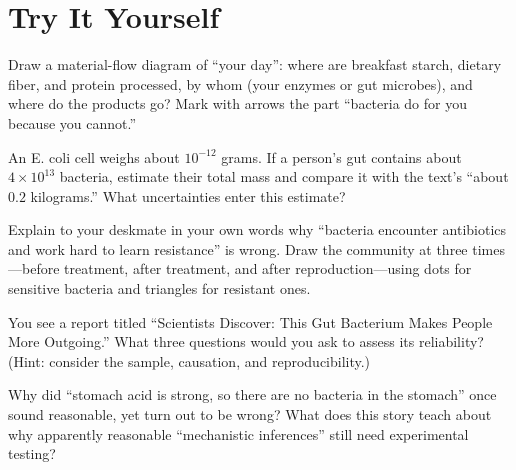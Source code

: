 \section*{Try It Yourself}

\begin{sikaoti}
\item Draw a material-flow diagram of ``your day'': where are breakfast starch, dietary fiber, and protein processed, by whom (your enzymes or gut microbes), and where do the products go? Mark with arrows the part ``bacteria do for you because you cannot.''
\item An E. coli cell weighs about $10^{-12}$ grams. If a person's gut contains about $4\times 10^{13}$ bacteria, estimate their total mass and compare it with the text's ``about $0.2$ kilograms.'' What uncertainties enter this estimate?
\item Explain to your deskmate in your own words why ``bacteria encounter antibiotics and work hard to learn resistance'' is wrong. Draw the community at three times---before treatment, after treatment, and after reproduction---using dots for sensitive bacteria and triangles for resistant ones.
\item You see a report titled ``Scientists Discover: This Gut Bacterium Makes People More Outgoing.'' What three questions would you ask to assess its reliability? (Hint: consider the sample, causation, and reproducibility.)
\item Why did ``stomach acid is strong, so there are no bacteria in the stomach'' once sound reasonable, yet turn out to be wrong? What does this story teach about why apparently reasonable ``mechanistic inferences'' still need experimental testing?
\end{sikaoti}
